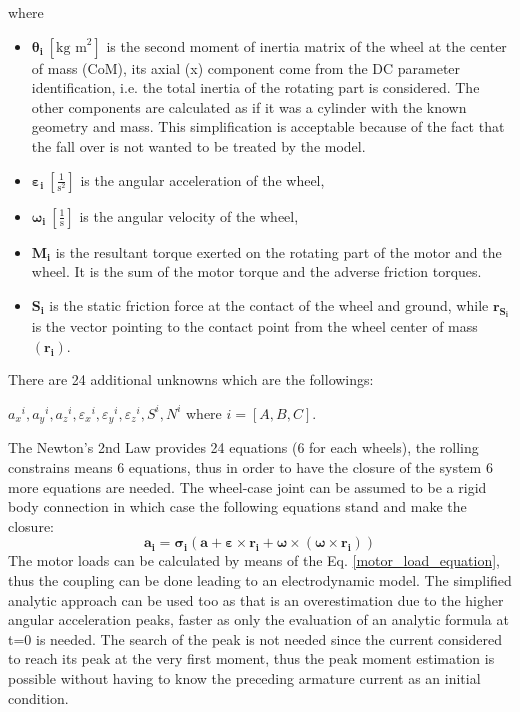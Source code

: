 \documentclass[12pt,english]{article}
\begin{document}
where \begin{itemize}
	\item $\boldsymbol{\theta_i}~[\text{kg m}^2]$ is the second moment of inertia matrix of the wheel at the center of mass (CoM), its axial (x) component come from the DC parameter identification, i.e. the total inertia of the rotating part is considered.
	The other components are calculated as if it was a cylinder with the known geometry and mass. This simplification is acceptable because of the fact that the fall over is not wanted to be treated by the model.
	\item $\boldsymbol{\varepsilon_i}~[\frac{1}{\text{s}^2}]$ is the angular acceleration of the wheel,
	\item $\boldsymbol{\omega_i}~[\frac{1}{\text{s}}]$ is the angular velocity of the wheel,
	\item $\mathbf{M_i}$ is the resultant torque exerted on the rotating part of the motor and the wheel. It is the sum of the motor torque and the adverse friction torques.
	\item $\mathbf{S_i}$ is the static friction force at the contact of the wheel and ground, while $\mathbf{r_{S_i}}$ is the vector pointing to the contact point from the wheel center of mass $(\mathbf{r_{i}})$.
\end{itemize}
There are 24 additional unknowns which are the followings:
\begin{center}
	${a_x}^i,{a_y}^i,{a_z}^i,{\varepsilon_x}^i,{\varepsilon_y}^i,{\varepsilon_z}^i,S^i,N^i$ where $i=[A,B,C]$.
\end{center}
The Newton's 2nd Law provides 24 equations (6 for each wheels), the rolling constrains means 6 equations, thus in order to have the closure of the system 6 more equations are needed.
The wheel-case joint can be assumed to be a rigid body connection in which case the following equations stand and make the closure:
\begin{equation}
	\mathbf{a_i} = \boldsymbol{\sigma_i} (\mathbf{a}+\boldsymbol{\varepsilon} \times \mathbf{r_i}+\boldsymbol{\omega} \times (\boldsymbol{\omega} \times \mathbf{r_i}))
\end{equation}
The motor loads can be calculated by means of the Eq. \ref{motor_load_equation}, thus the coupling can be done leading to an electrodynamic model. The simplified analytic approach can be used too as that is an overestimation due to the higher angular acceleration peaks, faster as only the evaluation of an analytic formula at t=0 is needed. The search of the peak is not needed since the current considered to reach its peak at the very first moment, thus the peak moment estimation is possible without having to know the preceding armature current as an initial condition. 
\end{document}
